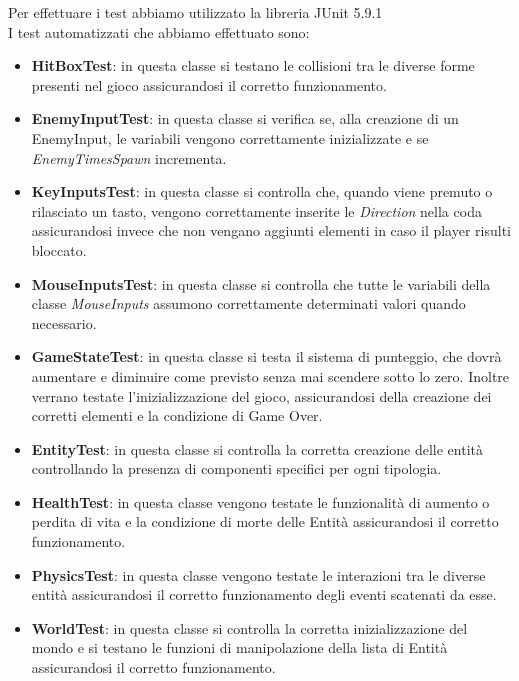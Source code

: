 \documentclass[a4paper,12pt]{report}
\begin{document}
Per effettuare i test abbiamo utilizzato la libreria JUnit 5.9.1
\\I test automatizzati che abbiamo effettuato sono:
\begin{itemize}
    \item \textbf{HitBoxTest}: in questa classe si testano le collisioni tra le diverse forme presenti nel gioco assicurandosi il corretto funzionamento.
    
    \item \textbf{EnemyInputTest}: in questa classe si verifica se, alla creazione di un EnemyInput, le variabili vengono correttamente 
        inizializzate e se \emph{EnemyTimesSpawn} incrementa.
    
    \item \textbf{KeyInputsTest}: in questa classe si controlla che, quando viene premuto o rilasciato un tasto, vengono correttamente 
        inserite le \emph{Direction} nella coda assicurandosi invece che non vengano aggiunti elementi in caso il player risulti bloccato. 
    
    \item \textbf{MouseInputsTest}: in questa classe si controlla che tutte le variabili della classe \emph{MouseInputs}  
        assumono correttamente determinati valori quando necessario.
    
    \item \textbf{GameStateTest}: in questa classe si testa il sistema di punteggio, che dovrà aumentare e diminuire come previsto senza mai scendere sotto lo zero. Inoltre verrano testate l'inizializzazione del gioco, assicurandosi della creazione dei corretti elementi e la condizione di Game Over.
    
    \item \textbf{EntityTest}: in questa classe si controlla la corretta creazione delle entità controllando la presenza di componenti specifici per ogni tipologia.
    
    \item \textbf{HealthTest}: in questa classe vengono testate le funzionalità di aumento o perdita di vita e la condizione di morte delle Entità assicurandosi il corretto funzionamento.
    
    \item \textbf{PhysicsTest}: in questa classe vengono testate le interazioni tra le diverse entità assicurandosi il corretto funzionamento degli eventi scatenati da esse.
    
    \item \textbf{WorldTest}: in questa classe si controlla la corretta inizializzazione del mondo e si testano le funzioni di manipolazione della lista di Entità assicurandosi il corretto funzionamento.
\end{itemize}
\end{document}
